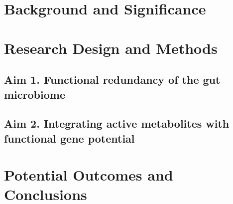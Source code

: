 \documentclass[12pt]{article}
\begin{document}
\section*{Background and Significance}


\section*{Research Design and Methods}

\subsection*{Aim 1. Functional redundancy of the gut microbiome}


\subsection*{Aim 2. Integrating active metabolites with functional gene potential}


\section*{Potential Outcomes and Conclusions}


\pagebreak

\section*{\refname}
\footnotesize{

\par}
\end{document}
